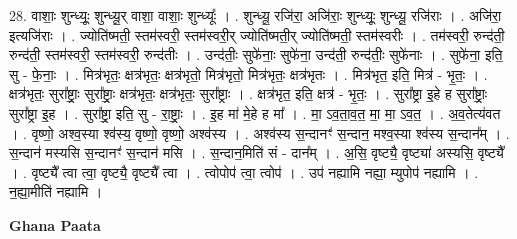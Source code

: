 \documentclass[17pt]{extarticle}
\begin{document}
28. वाशाः॒ शुन्ध्यूः॒ शुन्ध्यू॒र् वाशा॒ वाशाः॒ शुन्ध्यूः᳚ । . शुन्ध्यू॒ रजि॑रा॒ अजि॑राः॒ शुन्ध्यूः॒ शुन्ध्यू॒ रजि॑राः । . अजि॑रा॒ इत्यजि॑राः । . ज्योति॑ष्मती॒ स्तम॑स्वरी॒ स्तम॑स्वरी॒र् ज्योति॑ष्मती॒र् ज्योति॑ष्मती॒ स्तम॑स्वरीः । . तम॑स्वरी॒ रुन्द॑ती॒ रुन्द॑ती॒ स्तम॑स्वरी॒ स्तम॑स्वरी॒ रुन्द॑तीः । . उन्द॑तीः॒ सुफे॑नाः॒ सुफे॑ना॒ उन्द॑ती॒ रुन्द॑तीः॒ सुफे॑नाः । . सुफे॑ना॒ इति॒ सु - फे॒नाः॒ । . मित्र॑भृतः॒ क्षत्र॑भृतः॒ क्षत्र॑भृतो॒ मित्र॑भृतो॒ मित्र॑भृतः॒ क्षत्र॑भृतः । . मित्र॑भृत॒ इति॒ मित्र॑ - भृ॒तः॒ । . क्षत्र॑भृतः॒ सुरा᳚ष्ट्राः॒ सुरा᳚ष्ट्राः॒ क्षत्र॑भृतः॒ क्षत्र॑भृतः॒ सुरा᳚ष्ट्राः । . क्षत्र॑भृत॒ इति॒ क्षत्र॑ - भृ॒तः॒ । . सुरा᳚ष्ट्रा इ॒हे ह सुरा᳚ष्ट्राः॒ सुरा᳚ष्ट्रा इ॒ह । . सुरा᳚ष्ट्रा॒ इति॒ सु - रा॒ष्ट्राः॒ । . इ॒ह मा॑ मे॒हे ह मा᳚ । . मा॒ ऽव॒ता॒व॒त॒ मा॒ मा॒ ऽव॒त॒ । . अ॒व॒तेत्य॑वत । . वृष्णो॒ अश्व॒स्या श्व॑स्य॒ वृष्णो॒ वृष्णो॒ अश्व॑स्य । . अश्व॑स्य स॒न्दानꣳ॑ स॒न्दान॒ मश्व॒स्या श्व॑स्य स॒न्दान᳚म् । . स॒न्दान॑ मस्यसि स॒न्दानꣳ॑ स॒न्दान॑ मसि । . स॒न्दान॒मिति॑ सं - दान᳚म् । . अ॒सि॒ वृष्ट्यै॒ वृष्ट्या॑ अस्यसि॒ वृष्ट्यै᳚ । . वृष्ट्यै᳚ त्वा त्वा॒ वृष्ट्यै॒ वृष्ट्यै᳚ त्वा । . त्वोपोप॑ त्वा॒ त्वोप॑ । . उप॑ नह्यामि नह्या॒ म्युपोप॑ नह्यामि । . न॒ह्या॒मीति॑ नह्यामि । \newline

\textbf{Ghana Paata } \newline
\end{document}
